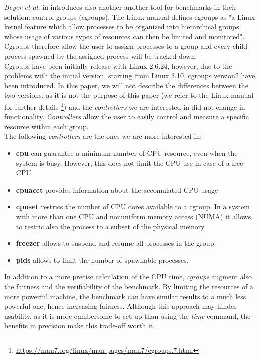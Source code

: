 \textit{Beyer et al.} in \cite{Beyer2017ReliableBR} introduces also another another tool for benchmarks in their solution: control groups (cgroups). The Linux manual defines cgroups as "a Linux kernel feature which allow processes to be organized into hierarchical groups whose usage of various types of resources can then be limited and monitored". \cite{LinuxManualWeb} Cgroups therefore allow the user to assign processes to a group and every child process spawned by the assigned process will be tracked down. \\
Cgroups have been initially release with Linux 2.6.24, however, due to the problems with the initial version, starting from Linux 3.10, cgroups version2 have been introduced. In this paper, we will not describe the differences between the two versions, as it is not the purpose of this paper (we refer to the Linux manual for further details \footnote{ \url{https://man7.org/linux/man-pages/man7/cgroups.7.html}}) and the \textit{controllers} we are interested in did not change in functionality.  \textit{Controllers} allow the user to easily control and measure a specific resource within each group. \cite{Beyer2017ReliableBR}\\
The following \textit{controllers} are the ones we are more interested in:
\begin{itemize}
    \item[] \textbf{cpu} \quad    can guarantee a minimum number of CPU resource, even when the system is busy. However, this does not limit the CPU use in case of a free CPU
    \item[] \textbf{cpuacct} \quad provides information about the accomulated CPU usage
    \item[] \textbf{cpuset} \quad restrics the number of CPU cores available to a cgroup. In a system with more than one CPU and nonuniform memory access (NUMA) it allows to restric also the process to a subset of the physical memory  \cite{Beyer2017ReliableBR}
    \item[] \textbf{freezer} \quad allows to suspend and resume all processes in the group
    \item[] \textbf{pids} \quad allows to limit the number of spawnable processes. 
\end{itemize}
In addition to a more precise calculation of the CPU time, \textit{cgroups} augment also the fairness and the verifiability of the benchmark. By limiting the resources of a more powerful machine, the benchmark can have similar results to a much less powerful one, hence increasing fairness. 
Although this approach may hinder usability, as it is more cumbersome to set up than using the \textit{time} command, the benefits in precision make this trade-off worth it. 
